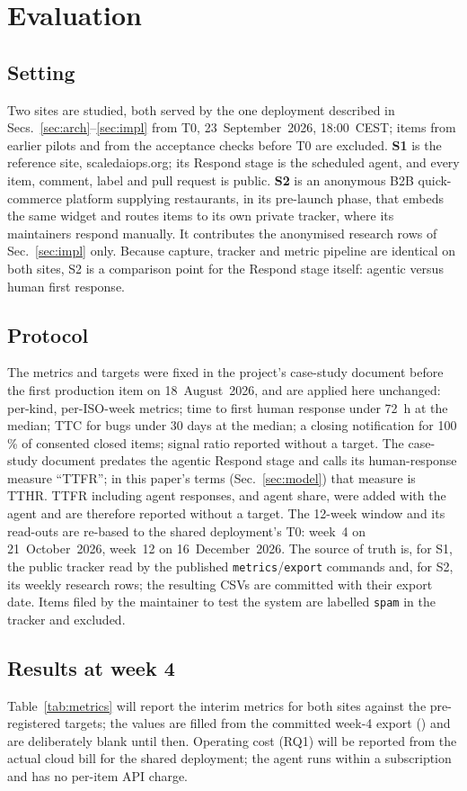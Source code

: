 \section{Evaluation}\label{sec:eval}
\subsection{Setting}
Two sites are studied, both served by the one deployment described in Secs.~\ref{sec:arch}--\ref{sec:impl} from T0, 23~September~2026, 18:00~CEST; items from earlier pilots and from the acceptance checks before T0 are excluded. \textbf{S1} is the reference site, scaledaiops.org; its Respond stage is the scheduled agent, and every item, comment, label and pull request is public. \textbf{S2} is an anonymous B2B quick-commerce platform supplying restaurants, in its pre-launch phase, that embeds the same widget and routes items to its own private tracker, where its maintainers respond manually. It contributes the anonymised research rows of Sec.~\ref{sec:impl} only. Because capture, tracker and metric pipeline are identical on both sites, S2 is a comparison point for the Respond stage itself: agentic versus human first response.
\subsection{Protocol}
The metrics and targets were fixed in the project's case-study document before the first production item on 18~August~2026, and are applied here unchanged: per-kind, per-ISO-week metrics; time to first human response under 72~h at the median; TTC for bugs under 30 days at the median; a closing notification for 100\,\% of consented closed items; signal ratio reported without a target. The case-study document predates the agentic Respond stage and calls its human-response measure ``TTFR''; in this paper's terms (Sec.~\ref{sec:model}) that measure is TTHR. TTFR including agent responses, and agent share, were added with the agent and are therefore reported without a target. The 12-week window and its read-outs are re-based to the shared deployment's T0: week~4 on 21~October~2026, week~12 on 16~December~2026. The source of truth is, for S1, the public tracker read by the published \texttt{metrics}/\texttt{export} commands and, for S2, its weekly research rows; the resulting CSVs are committed with their export date. Items filed by the maintainer to test the system are labelled \texttt{spam} in the tracker and excluded.
\subsection{Results at week 4}
Table~\ref{tab:metrics} will report the interim metrics for both sites against the pre-registered targets; the values are filled from the committed week-4 export () and are deliberately blank until then. Operating cost (RQ1) will be reported from the actual cloud bill for the shared deployment; the agent runs within a subscription and has no per-item API charge.

